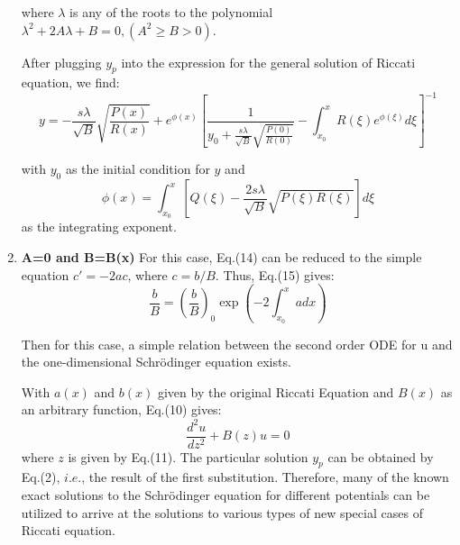 \documentclass{article}
\begin{document}
\begin{enumerate}
where $\lambda$ is any of the roots to the polynomial $\lambda ^ { 2 } + 2 A \lambda + B = 0 , (A ^ { 2 } \geq B > 0)$.

After plugging $y_p$ into the expression for the general solution of Riccati equation, we find:
\begin{equation}
y = - \frac { s \lambda } { \sqrt { B } } \sqrt { \frac { P ( x ) } { R ( x ) } } + e ^ { \phi ( x ) } \left[ \frac { 1 } { y _ { 0 } + \frac { s \lambda } { \sqrt { B } } \sqrt { \frac { P ( 0 ) } { R ( 0 ) } } } - \int _ { x _ { 0 } } ^ { x } R ( \xi ) e ^ { \phi ( \xi ) } d \xi \right] ^ { - 1 }
\end{equation}

with $y_0$ as the initial condition for $y$ and 
\begin{equation}
\phi ( x ) = \int _ { x _ { 0 } } ^ { x } \left[ Q ( \xi ) - \frac { 2 s \lambda } { \sqrt { B } } \sqrt { P ( \xi ) R ( \xi ) } \right] d \xi
\end{equation}
as the integrating exponent.

\item \textbf{A=0 and B=B(x)} For this case, Eq.(14) can be reduced to the simple equation $c'=-2ac$, where $c=b/B$. Thus, Eq.(15) gives:
\begin{equation}
\frac { b } { B } = \left( \frac { b } { B } \right) _ { 0 } \exp \left( - 2 \int _ { x _ { 0 } } ^ { x } a d x \right)
\end{equation}

Then for this case, a simple relation between the second order ODE for u and the one-dimensional
Schr\"{o}dinger equation exists. 

With $a(x)$ and $b(x)$ given by the original Riccati Equation and $B(x)$ as an arbitrary function, Eq.(10) gives:
\begin{equation}
\frac { d ^ { 2 } u } { d z ^ { 2 } } + B ( z ) u = 0
\end{equation}
where $z$ is given by Eq.(11). The particular solution $y_p$ can be obtained by Eq.(2), $i.e.$, the result of the first substitution. Therefore, many of the known exact solutions to the
Schr\"{o}dinger equation for different potentials can be utilized to arrive at the solutions to various types of new special cases of Riccati equation.


\end{enumerate}
\end{document}
